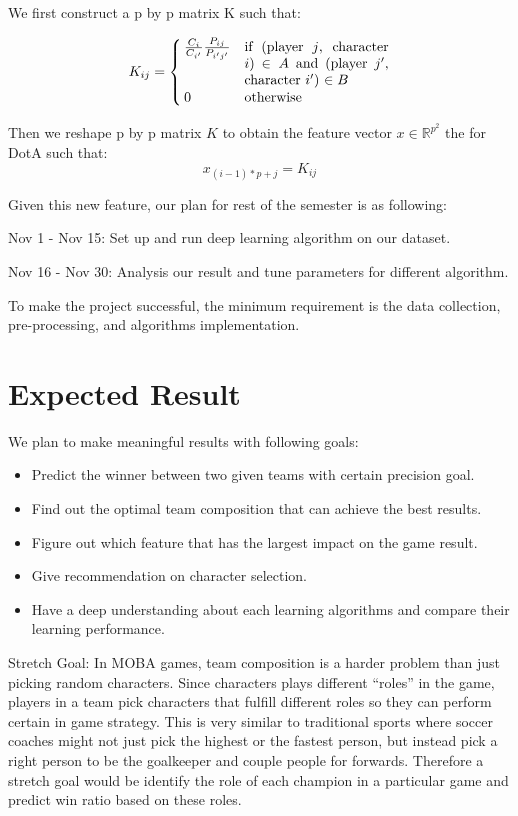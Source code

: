 \documentclass[conference]{IEEEtran}
\begin{document}
We first construct a p by p matrix K such that:

\begin{equation*}
K_{ij} = 
    \begin{cases}
        \frac{C_i}{C_{i'}} \frac{P_{ij}}{P_{i'j'}} & \parbox[t]{.3\textwidth}{if (player $j$, character $i$) $\in A$ and (player $j'$, character $i'$) $\in B$  }\\
        0 & \text{otherwise}
    \end{cases}
\end{equation*}

Then we reshape p by p matrix $K$ to obtain the feature vector $x \in \mathbb{R}^{p^2}$ the for DotA such that:
\[
x_{(i-1)*p + j} = K_{ij} 
\]

Given this new feature, our plan for rest of the semester is as following:

Nov 1 - Nov 15: Set up and run deep learning algorithm on our dataset.

Nov 16 - Nov 30: Analysis our result and tune parameters for different algorithm.

To make the project successful, the minimum requirement is the data collection, pre-processing, and algorithms implementation.

\section{Expected Result}
We plan to make meaningful results with following goals:

\begin{itemize}
  \item Predict the winner between two given teams with certain precision goal.
  \item Find out the optimal team composition that can achieve the best results.
  \item Figure out which feature that has the largest impact on the game result.
  \item Give recommendation on character selection.
  \item Have a deep understanding about each learning algorithms and compare their learning performance.
\end{itemize}

Stretch Goal:
In MOBA games, team composition is a harder problem than just picking random characters. Since characters plays different ``roles'' in the game, players in a team pick characters that fulfill different roles so they can perform certain in game strategy. This is very similar to traditional sports where soccer coaches might not just pick the highest or the fastest person, but instead pick a right person to be the goalkeeper and couple people for forwards. Therefore a stretch goal would be identify the role of each champion in a particular game and predict win ratio based on these roles.
\end{document}
